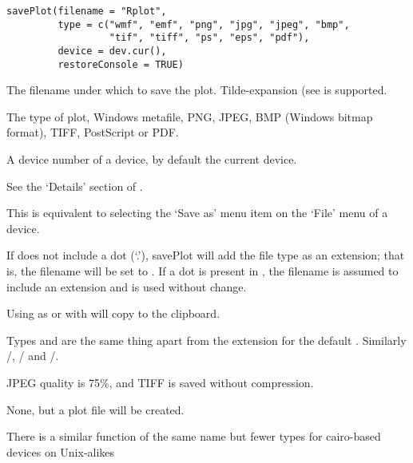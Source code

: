 %
\begin{Usage}
\begin{verbatim}
savePlot(filename = "Rplot",
         type = c("wmf", "emf", "png", "jpg", "jpeg", "bmp",
                  "tif", "tiff", "ps", "eps", "pdf"),
         device = dev.cur(),
         restoreConsole = TRUE)
\end{verbatim}
\end{Usage}
%
\begin{Arguments}
\begin{ldescription}
\item[\code{filename}] The filename under which to save the plot.
Tilde-expansion (see  is supported.
\item[\code{type}] The type of plot, Windows metafile, PNG, JPEG, BMP
(Windows bitmap format), TIFF, PostScript or PDF.
\item[\code{device}] A device number of a  device, by default
the current device.
\item[\code{restoreConsole}] See the `Details' section
of .
\end{ldescription}
\end{Arguments}
%
\begin{Details}\relax
This is equivalent to selecting the `Save as' menu item on the
`File' menu of a  device.

If  does not include a dot (`.'), savePlot
will add the file type as an extension; that is, the filename will
be set to . If a dot is present in
, the filename is assumed to include an extension and
is used without change.

Using  as  or  with
 will copy to the clipboard.

Types  and  are the same thing apart from the
extension for the default .  Similarly
/, / and
/.

JPEG quality is 75\%, and TIFF is saved without compression.
\end{Details}
%
\begin{Value}
None, but a plot file will be created.
\end{Value}
%
\begin{Note}\relax
There is a similar function of the same name but fewer types for
cairo-based  devices on Unix-alikes
\end{Note}
